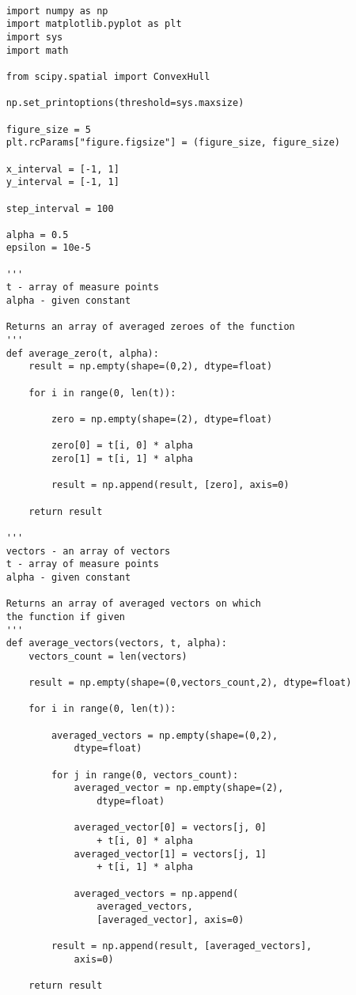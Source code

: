 \documentclass[12pt]{article}
\begin{document}
\begin{verbatim}
	
	import numpy as np
	import matplotlib.pyplot as plt
	import sys
	import math
	
	from scipy.spatial import ConvexHull
	
	np.set_printoptions(threshold=sys.maxsize)
	
	figure_size = 5
	plt.rcParams["figure.figsize"] = (figure_size, figure_size)
	
	x_interval = [-1, 1]
	y_interval = [-1, 1]
	
	step_interval = 100
	
	alpha = 0.5
	epsilon = 10e-5
	
	'''
	t - array of measure points
	alpha - given constant
	
	Returns an array of averaged zeroes of the function
	'''
	def average_zero(t, alpha):    
		result = np.empty(shape=(0,2), dtype=float)
		
		for i in range(0, len(t)):
		
			zero = np.empty(shape=(2), dtype=float)
			
			zero[0] = t[i, 0] * alpha
			zero[1] = t[i, 1] * alpha
			
			result = np.append(result, [zero], axis=0)
		
		return result
	
	'''
	vectors - an array of vectors
	t - array of measure points
	alpha - given constant
	
	Returns an array of averaged vectors on which
	the function if given
	'''
	def average_vectors(vectors, t, alpha):
		vectors_count = len(vectors)
		
		result = np.empty(shape=(0,vectors_count,2), dtype=float)
		
		for i in range(0, len(t)):
		
			averaged_vectors = np.empty(shape=(0,2), 
				dtype=float)
			
			for j in range(0, vectors_count):
				averaged_vector = np.empty(shape=(2), 
					dtype=float)
				
				averaged_vector[0] = vectors[j, 0]
					+ t[i, 0] * alpha
				averaged_vector[1] = vectors[j, 1] 
					+ t[i, 1] * alpha
				
				averaged_vectors = np.append(
					averaged_vectors, 
					[averaged_vector], axis=0)
			
			result = np.append(result, [averaged_vectors], 
				axis=0)
		
		return result
		

\end{verbatim}
\end{document}
